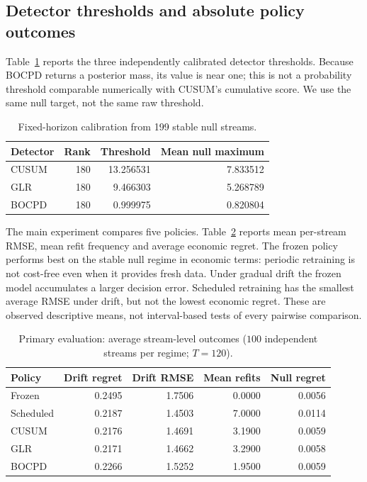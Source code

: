 \documentclass[11pt,a4paper]{article}
\begin{document}
\subsection{Detector thresholds and absolute policy outcomes}
Table~\ref{tab:thresholds} reports the three independently calibrated detector thresholds. Because BOCPD returns a posterior mass, its value is near one; this is not a probability threshold comparable numerically with CUSUM's cumulative score. We use the same null target, not the same raw threshold.
\begin{table}[ht]\centering\caption{Fixed-horizon calibration from 199 stable null streams.}\label{tab:thresholds}
\begin{tabular}{lrrr}\toprule Detector & Rank & Threshold & Mean null maximum\\\midrule
CUSUM & 180 & 13.256531 & 7.833512\\
GLR & 180 & 9.466303 & 5.268789\\
BOCPD & 180 & 0.999975 & 0.820804\\\bottomrule\end{tabular}
\end{table}

The main experiment compares five policies. Table~\ref{tab:policy} reports mean per-stream RMSE, mean refit frequency and average economic regret. The frozen policy performs best on the stable null regime in economic terms: periodic retraining is not cost-free even when it provides fresh data. Under gradual drift the frozen model accumulates a larger decision error. Scheduled retraining has the smallest average RMSE under drift, but not the lowest economic regret. These are observed descriptive means, not interval-based tests of every pairwise comparison.
\begin{table}[ht]\centering\caption{Primary evaluation: average stream-level outcomes ($100$ independent streams per regime; $T=120$).}\label{tab:policy}\small
\begin{tabular}{lrrrr}
\toprule
Policy & Drift regret & Drift RMSE & Mean refits & Null regret\\
\midrule
Frozen & 0.2495 & 1.7506 & 0.0000 & 0.0056\\
Scheduled & 0.2187 & 1.4503 & 7.0000 & 0.0114\\
CUSUM & 0.2176 & 1.4691 & 3.1900 & 0.0059\\
GLR & 0.2171 & 1.4662 & 3.2900 & 0.0058\\
BOCPD & 0.2266 & 1.5252 & 1.9500 & 0.0059\\
\bottomrule
\end{tabular}
\end{table}
\end{document}
